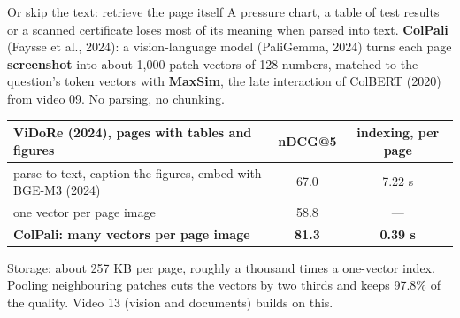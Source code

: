 \documentclass[aspectratio=169]{beamer}
\newcommand{\watchbox}[1]{%
  \begin{tcolorbox}[colback=armorange!12, colframe=armorange, boxrule=0.6pt, arc=2pt]
  #1
  \end{tcolorbox}}
\begin{document}
\begin{frame}{Or skip the text: retrieve the page itself}
  \vspace{0.1em}
  {\small A pressure chart, a table of test results or a scanned certificate loses most of its
  meaning when parsed into text. \textbf{ColPali} (Faysse et al., 2024): a vision-language model
  (PaliGemma, 2024) turns each page \textbf{screenshot} into about 1{,}000 patch vectors of 128
  numbers, matched to the question's token vectors with \textbf{MaxSim}, the late interaction of
  ColBERT (2020) from video 09. No parsing, no chunking.}

  \vspace{0.1em}
  \begin{center}
  \footnotesize
  \begin{tabular}{lcc}
    \toprule
    \textbf{ViDoRe (2024), pages with tables and figures} & \textbf{nDCG@5} & \textbf{indexing, per page} \\
    \midrule
    parse to text, caption the figures, embed with BGE-M3 (2024) & 67.0 & 7.22 s \\
    one vector per page image                                     & 58.8 & --- \\
    \textbf{ColPali: many vectors per page image}                 & \textbf{81.3} & \textbf{0.39 s} \\
    \bottomrule
  \end{tabular}
  \end{center}

  \vspace{0.1em}
  \watchbox{\small Storage: about 257 KB per page, roughly a thousand times a one-vector index.
  Pooling neighbouring patches cuts the vectors by two thirds and keeps 97.8\% of the quality.
  Video 13 (vision and documents) builds on this.}
\end{frame}
\end{document}
